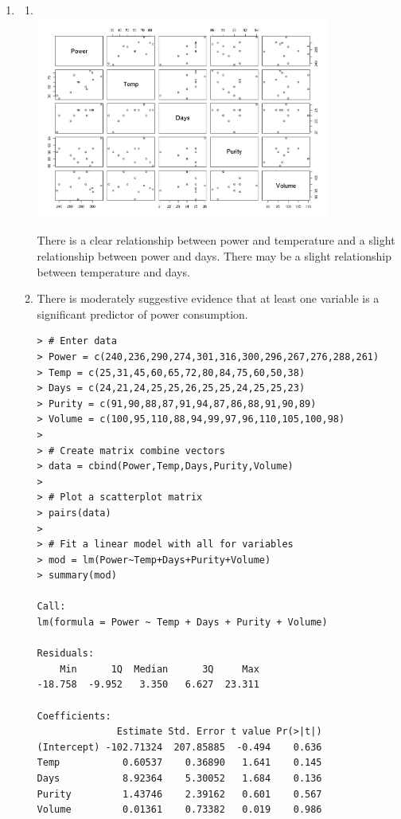 \documentclass[12pt,letterpaper]{article}
\begin{document}
\begin{enumerate}
  \item
    \begin{enumerate}
      \item \hfill\\
        \includegraphics[width=0.8\textwidth]{2a.png}

        There is a clear relationship between power and temperature and
        a slight relationship between power and days. There may be a slight
        relationship between temperature and days.
      \item There is moderately suggestive evidence that at least one variable
        is a significant predictor of power consumption.

        \begin{verbatim}
> # Enter data
> Power = c(240,236,290,274,301,316,300,296,267,276,288,261)
> Temp = c(25,31,45,60,65,72,80,84,75,60,50,38)
> Days = c(24,21,24,25,25,26,25,25,24,25,25,23)
> Purity = c(91,90,88,87,91,94,87,86,88,91,90,89)
> Volume = c(100,95,110,88,94,99,97,96,110,105,100,98)
>
> # Create matrix combine vectors
> data = cbind(Power,Temp,Days,Purity,Volume)
>
> # Plot a scatterplot matrix
> pairs(data)
>
> # Fit a linear model with all for variables
> mod = lm(Power~Temp+Days+Purity+Volume)
> summary(mod)

Call:
lm(formula = Power ~ Temp + Days + Purity + Volume)

Residuals:
    Min      1Q  Median      3Q     Max
-18.758  -9.952   3.350   6.627  23.311 

Coefficients:
              Estimate Std. Error t value Pr(>|t|)
(Intercept) -102.71324  207.85885  -0.494    0.636
Temp           0.60537    0.36890   1.641    0.145
Days           8.92364    5.30052   1.684    0.136
Purity         1.43746    2.39162   0.601    0.567
Volume         0.01361    0.73382   0.019    0.986


\end{verbatim}
\end{enumerate}
\end{enumerate}
\end{document}
